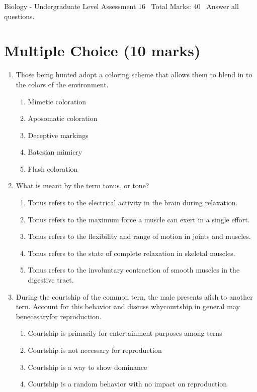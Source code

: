 \documentclass[12pt]{article}
\begin{document}
\begin{center}
Biology - Undergraduate Level Assessment 16 \
Total Marks: 40 \
Answer all questions.
\end{center}

\section*{Multiple Choice (10 marks)}
\begin{enumerate}[label=\arabic*.]
\item Those being hunted adopt a coloring scheme that allows them to blend in to the colors of the environment.
\begin{enumerate}[label=(\alph*)]
    \item Mimetic coloration
    \item Aposomatic coloration
    \item Deceptive markings
    \item Batesian mimicry
    \item Flash coloration
\end{enumerate}
\item What is meant by the term tonus, or tone?
\begin{enumerate}[label=(\alph*)]
    \item Tonus refers to the electrical activity in the brain during relaxation.
    \item Tonus refers to the maximum force a muscle can exert in a single effort.
    \item Tonus refers to the flexibility and range of motion in joints and muscles.
    \item Tonus refers to the state of complete relaxation in skeletal muscles.
    \item Tonus refers to the involuntary contraction of smooth muscles in the digestive tract.
\end{enumerate}
\item During the courtship of the common tern, the male presents afish to another tern. Account for this behavior and discuss whycourtship in general may benecesaryfor reproduction.
\begin{enumerate}[label=(\alph*)]
    \item Courtship is primarily for entertainment purposes among terns
    \item Courtship is not necessary for reproduction
    \item Courtship is a way to show dominance
    \item Courtship is a random behavior with no impact on reproduction

\end{enumerate}
\end{enumerate}
\end{document}
